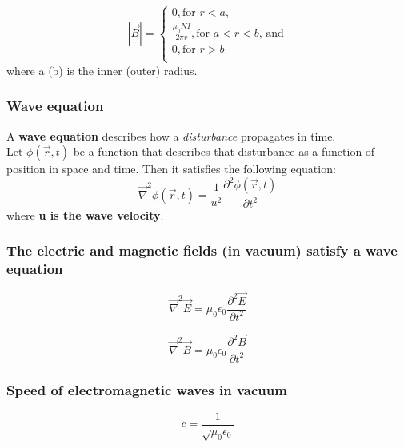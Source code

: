 \documentclass[english,11pt]{article}
\begin{document}
\begin{equation*}
  |\vec{B}| = \left\{ \begin{array}{l}
         0, \text{for $r < a$,} \\
         \frac{\mu_0 N I}{2\pi r}, \text{for $a < r < b$, and} \\
         0, \text{for $r > b$} \\
    \end{array} \right.
\end{equation*}
where a (b) is the inner (outer) radius.


\subsubsection*{\bf Wave equation}

A {\bf wave equation} describes how a {\em disturbance} propagates in time.\\

Let $\phi(\vec{r}, t)$ be a function that describes that disturbance as a function of position in space and time.
Then it satisfies the following equation:
\begin{equation*}
   \vec{\nabla}^{2} \phi(\vec{r}, t) = \frac{1}{u^2} \frac{\partial^{2} \phi(\vec{r}, t)} {\partial t^{2}}
\end{equation*}
where {\bf u is the wave velocity}.\\


\subsubsection*{\bf The electric and magnetic fields (in vacuum) satisfy a wave equation}

\begin{equation*}
  \vec{\nabla}^{2} \vec{E} = \mu_0 \epsilon_0 \frac{\partial^{2} \vec{E}}{\partial t^{2}}
\end{equation*}

\begin{equation*}
  \vec{\nabla}^{2} \vec{B} = \mu_0 \epsilon_0 \frac{\partial^{2} \vec{B}}{\partial t^{2}}
\end{equation*}

\subsubsection*{\bf Speed of electromagnetic waves in vacuum}
\begin{equation*}
  c = \frac{1}{\sqrt{\mu_0 \epsilon_0}}
\end{equation*}
\end{document}
